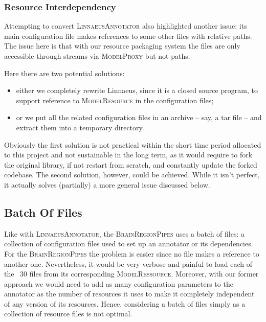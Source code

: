 \documentclass{article}
\newcommand{\ID}[1]{\mbox{\textsc{#1}}}
\begin{document}
\subsubsection{Resource Interdependency}

Attempting to convert \ID{LinnaeusAnnotator} also highlighted another issue: its main configuration
file makes references to some other files with relative paths. The issue here is that with our resource packaging system the files are only accessible through streams via \ID{ModelProxy} but not paths.

Here there are two potential solutions:

\begin{itemize}

\item either we completely rewrite Linnaeus, since it is a closed source program, to support reference to \ID{ModelResource} in the configuration files;

\item or we put all the related configuration files in an archive -- say, a tar file -- and extract them into a temporary directory.

\end{itemize}

Obviously the first solution is not practical within the short time period allocated to this project and not sustainable in the long term, as it would require to fork the original library, if not restart from scratch, and constantly update the forked codebase. The second solution, however, could be achieved. While it isn't perfect, it actually solves (partially) a more general issue discussed below.

\subsection{Batch Of Files}

Like with \ID{LinnaeusAnnotator}, the \ID{BrainRegionPipes} uses a batch of files: a collection of configuration files used to set up an annotator or its dependencies. For the \ID{BrainRegionPipes} the problem is easier since no file makes a reference to another one. Nevertheless, it would be very verbose and painful to load each of the ~30 files from its corresponding \ID{ModelRessource}. Moreover, with our former approach we would need to add as many configuration parameters to the annotator as the number of resources it uses to make it completely independent of any version of its resources. Hence, considering a batch of files simply as a collection of resource files is not optimal.
\end{document}
